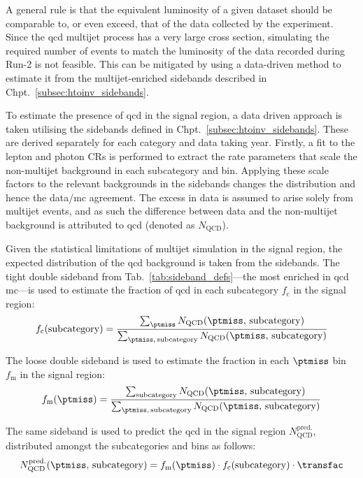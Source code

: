 A general rule is that the equivalent luminosity of a given dataset should be comparable to, or even exceed, that of the data collected by the experiment. Since the \acrshort{qcd} multijet process has a very large cross section, simulating the required number of events to match the luminosity of the data recorded during Run-2 is not feasible. This can be mitigated by using a data-driven method to estimate it from the multijet-enriched sidebands described in Chpt.~\ref{subsec:htoinv_sidebands}.

To estimate the presence of \acrshort{qcd} in the signal region, a data driven approach is taken utilising the sidebands defined in Chpt.~\ref{subsec:htoinv_sidebands}. These are derived separately for each category and data taking year. Firstly, a fit to the lepton and photon \glspl{CR} is performed to extract the rate parameters that scale the non-multijet background in each subcategory and \ptmiss bin. Applying these scale factors to the relevant backgrounds in the sidebands changes the distribution and hence the data/\acrshort{mc} agreement. The excess in data is assumed to arise solely from multijet events, and as such the difference between data and the non-multijet background is attributed to \acrshort{qcd} (denoted as $N_{\mathrm{QCD}}$).

Given the statistical limitations of multijet simulation in the signal region, the expected distribution of the \acrshort{qcd} background is taken from the sidebands. The tight double sideband from Tab.~\ref{tab:sideband_defs}---the most enriched in \acrshort{qcd} \acrshort{mc}---is used to estimate the fraction of \acrshort{qcd} in each subcategory $f_{\mathrm{c}}$ in the signal region:
\begin{equation}
    f_{\mathrm{c}}(\mathrm{subcategory}) = \frac{ \sum_{\ptmiss} N_{\mathrm{QCD}}(\ptmiss, \, \mathrm{subcategory}) }{ \sum_{\ptmiss, \, \mathrm{subcategory}} N_{\mathrm{QCD}}(\ptmiss, \, \mathrm{subcategory}) }
\end{equation}

The loose double sideband is used to estimate the fraction in each $\ptmiss$ bin $f_{\mathrm{m}}$ in the signal region:
\begin{equation}
    f_{\mathrm{m}}(\ptmiss) = \frac{ \sum_{\mathrm{subcategory}} N_{\mathrm{QCD}}(\ptmiss, \, \mathrm{subcategory}) }{ \sum_{\ptmiss, \, \mathrm{subcategory}} N_{\mathrm{QCD}}(\ptmiss, \, \mathrm{subcategory}) }
\end{equation}

The same sideband is used to predict the \acrshort{qcd} in the signal region $N_{\mathrm{QCD}}^{\mathrm{pred.}}$, distributed amongst the subcategories and \ptmiss bins as follows: 
\begin{equation}
    N_{\mathrm{QCD}}^{\mathrm{pred.}}(\ptmiss, \, \mathrm{subcategory}) = f_{\mathrm{m}}(\ptmiss) \cdot f_{\mathrm{c}}(\mathrm{subcategory}) \cdot \transfac
\end{equation}

